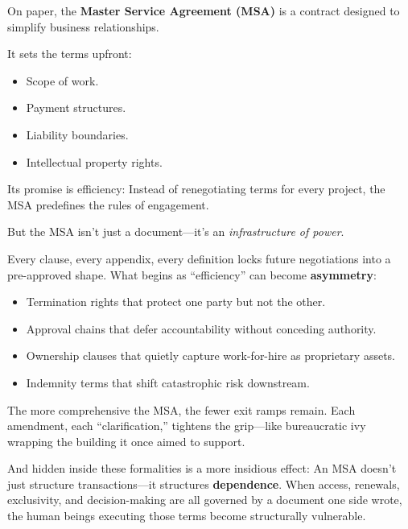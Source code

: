 \begin{tcolorbox}[colback=blue!5!white, colframe=blue!50!black, breakable,
  title={Philosophical Sidebar: The Master Service Agreement as a Weapon of Control}]

On paper, the \textbf{Master Service Agreement (MSA)} is a contract designed to simplify business relationships.

It sets the terms upfront:
\begin{itemize}
    \item Scope of work.
    \item Payment structures.
    \item Liability boundaries.
    \item Intellectual property rights.
\end{itemize}


Its promise is efficiency:  
Instead of renegotiating terms for every project, the MSA predefines the rules of engagement.

\medskip

But the MSA isn’t just a document—it’s an \textit{infrastructure of power}.

Every clause, every appendix, every definition locks future negotiations into a pre-approved shape.  
What begins as “efficiency” can become \textbf{asymmetry}:
\begin{itemize}
    \item Termination rights that protect one party but not the other.
    \item Approval chains that defer accountability without conceding authority.
    \item Ownership clauses that quietly capture work-for-hire as proprietary assets.
    \item Indemnity terms that shift catastrophic risk downstream.
\end{itemize}

The more comprehensive the MSA, the fewer exit ramps remain.  
Each amendment, each “clarification,” tightens the grip—like bureaucratic ivy wrapping the building it once aimed to support.

\medskip

And hidden inside these formalities is a more insidious effect:  
An MSA doesn’t just structure transactions—it structures \textbf{dependence}.  
When access, renewals, exclusivity, and decision-making are all governed by a document one side wrote, the human beings executing those terms become structurally vulnerable.


\end{tcolorbox}
